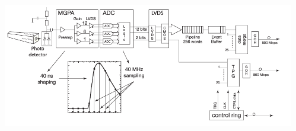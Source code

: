 \documentclass{beamer}
\begin{document}
\begin{frame}
\begin{columns}
\begin{column}{0.60\linewidth}
\begin{tcolorbox}[colback=UNL@Cream!5,colframe=UNL@Cream!70,title=\textcolor{UMN@Maroon}{\textbf{ECAL Properties.}}]
      \end{tcolorbox} 
     \end{column} 
     \begin{column}{0.45\linewidth}
       \begin{tcolorbox}[colback=UNL@Cream!5,colframe=UNL@Cream!70,title=\textcolor{UMN@Maroon}{\textbf{Readout Chain.}}]     
        \includegraphics[height=0.70\textwidth,width=0.95\linewidth]{THESISPLOTS/ReadOut.png}     
       \end{tcolorbox} 
     \end{column}
   \end{columns}
   
 
\end{frame}
\end{document}
